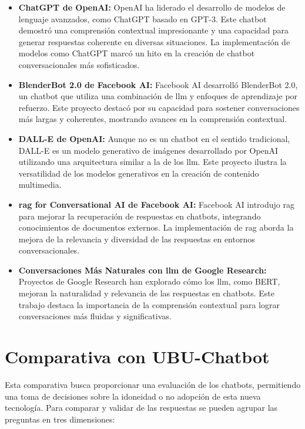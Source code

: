 \begin{itemize}
    \item \textbf{ChatGPT de OpenAI:} OpenAI ha liderado el desarrollo de modelos de lenguaje avanzados, como ChatGPT basado en GPT-3. Este chatbot demostró una comprensión contextual impresionante y una capacidad para generar respuestas coherente en diversas situaciones. La implementación de modelos como ChatGPT marcó un hito en la creación de chatbot conversacionales más sofisticados.

    \item \textbf{BlenderBot 2.0 de Facebook AI:} Facebook AI desarrolló BlenderBot 2.0, un chatbot que utiliza una combinación de \acrshort{llm} y enfoques de aprendizaje por refuerzo. Este proyecto destacó por su capacidad para sostener conversaciones más largas y coherentes, mostrando avances en la comprensión contextual.

    \item \textbf{DALL-E de OpenAI:} Aunque no es un chatbot en el sentido tradicional, DALL-E es un modelo generativo de imágenes desarrollado por OpenAI utilizando una arquitectura similar a la de los \acrshort{llm}. Este proyecto ilustra la versatilidad de los modelos generativos en la creación de contenido multimedia.

    \item \textbf{\acrshort{rag} for Conversational AI de Facebook AI:} Facebook AI introdujo \acrshort{rag} para mejorar la recuperación de respuestas en chatbots, integrando conocimientos de documentos externos. La implementación de \acrshort{rag} aborda la mejora de la relevancia y diversidad de las respuestas en entornos conversacionales.

    \item \textbf{Conversaciones Más Naturales con \acrshort{llm} de Google Research:} Proyectos de Google Research han explorado cómo los \acrshort{llm}, como BERT, mejoran la naturalidad y relevancia de las respuestas en chatbots. Este trabajo destaca la importancia de la comprensión contextual para lograr conversaciones más fluidas y significativas.

\end{itemize}

\section{Comparativa con UBU-Chatbot}

Esta comparativa busca proporcionar una evaluación de los chatbots, permitiendo una toma de decisiones sobre la idoneidad o no adopción de esta nueva tecnología. Para comparar y validar de las respuestas se pueden agrupar las preguntas en tres dimensiones:

